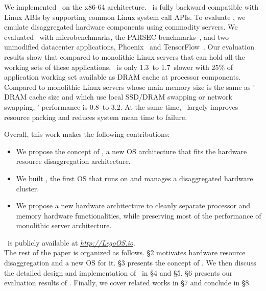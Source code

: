 We implemented \lego\ on the x86-64 architecture.
\lego\ is fully backward compatible with Linux ABIs
by supporting common Linux system call APIs.
To evaluate \lego, we emulate disaggregated hardware components using commodity servers.
We evaluated \lego\ with microbenchmarks, the PARSEC benchmarks~\cite{PARSEC}, %
and two unmodified datacenter applications, Phoenix~\cite{Ranger07-HPCA}
and TensorFlow~\cite{TensorFlow}.
Our evaluation results show that compared to monolithic Linux servers that can hold all the working sets of these applications,
\lego\ is only 1.3\x\ to 1.7\x\ slower with 25\% of application working set available as DRAM cache at processor components.
Compared to monolithic Linux servers whose main memory size is the same as \lego' DRAM cache size
and which use local SSD/DRAM swapping or network swapping,
\lego' performance is 0.8\x\ to 3.2\x.
At the same time, \lego\ largely improves resource packing %
and reduces system mean time to failure. %

Overall, this work makes the following contributions:

\begin{itemize}

\vspace{-0.065in}
\item We propose the concept of \splitkernel, a new OS architecture that fits the hardware resource disaggregation architecture.

\vspace{-0.065in}
\item We built \lego, the first OS that runs on and manages a disaggregated hardware cluster.

\vspace{-0.065in}
\item We propose a new hardware architecture to cleanly separate processor and memory hardware functionalities, 
while preserving most of the performance of monolithic server architecture.

\vspace{-0.065in}

\end{itemize}

\lego\ is publicly available at {\small {\em {\url{http://LegoOS.io}}}}.\\

The rest of the paper is organized as follows.
\S{}2 motivates hardware resource disaggregation and a new OS for it.
\S{}3 presents the concept of \splitkernel.
We then discuss the detailed design and implementation of \lego\ in \S{}4 and \S{}5.
\S{}6 presents our evaluation results of \lego.
Finally, we cover related works in \S{}7 and conclude in \S{}8.
\fi
